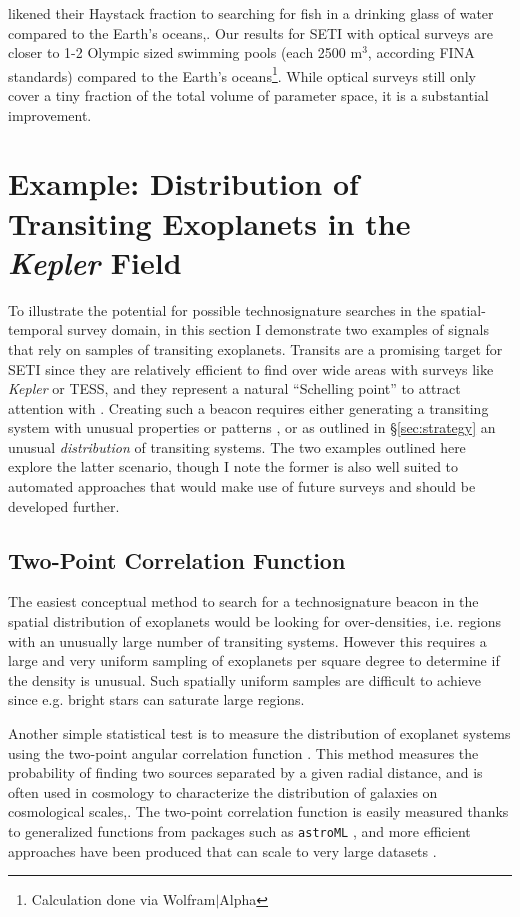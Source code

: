 \documentclass[twocolumn]{aastex62}
\newcommand{\Kepler}{\textsl{Kepler}\xspace}
\begin{document}
\citet{wright2018c} likened their Haystack fraction to searching for fish in a drinking glass of water compared to the Earth's oceans,. Our results for SETI with optical surveys are closer to 1-2 Olympic sized swimming pools (each 2500 m$^3$, according FINA standards) compared to the Earth's oceans\footnote{Calculation done via Wolfram$|$Alpha}. While optical surveys still only cover a tiny fraction of the total volume of parameter space, it is a substantial improvement.




\section{Example: Distribution of Transiting Exoplanets in the {\it Kepler} Field}
\label{sec:transit}

To illustrate the potential for possible technosignature searches in the spatial-temporal survey domain, in this section I demonstrate two examples of signals that rely on samples of transiting exoplanets. Transits are a promising target for SETI since they are relatively efficient to find over wide areas with surveys like \Kepler \citep{borucki2010} or TESS, and they represent a natural ``Schelling point'' to attract attention with \citep{wright2017}. Creating such a beacon requires either generating a transiting system with unusual properties or patterns \citep[e.g.][]{arnold2005,kipping2016,forgan2017}, or as outlined in \S\ref{sec:strategy} an unusual {\it distribution} of transiting systems. The two examples outlined here explore the latter scenario, though I note the former is also well suited to automated approaches that would make use of future surveys and should be developed further.


\subsection{Two-Point Correlation Function}

The easiest conceptual method to search for a technosignature beacon in the spatial distribution of exoplanets would be looking for over-densities, i.e. regions with an unusually large number of transiting systems. However this requires a large and very uniform sampling of exoplanets per square degree to determine if the density is unusual. Such spatially uniform samples are difficult to achieve since e.g. bright stars can saturate large regions.


Another simple statistical test is to measure the distribution of exoplanet systems using the two-point angular correlation function \citep{landy1993}. This method measures the probability of finding two sources separated by a given radial distance, and is often used in cosmology to characterize the distribution of galaxies on cosmological scales,. The two-point correlation function is easily measured thanks to generalized functions from packages such as {\tt astroML} \citep{astroMLText}, and  more efficient approaches have been produced that can scale to very large datasets \citep[e.g.][]{wang2013}.
\end{document}
